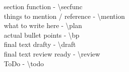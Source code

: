 \documentclass[twoside]{\myrootdir/zyx/mythesis}
\newcommand{\secfunc}[1]{{\color{magenta}#1}}
\newcommand{\mention}[1]{{\color{cyan}#1}}
\newcommand{\plan}[1]{{\color{purple}#1}}
\newcommand{\bp}[1]{{\color{violet}#1}}
\newcommand{\draft}[1]{{\color{blue}#1}}
\newcommand{\review}[1]{{\color{black}#1}}
\newcommand{\todo}[1]{{\color{orange}#1}}
\begin{document}



\secfunc{section function - \textbackslash secfunc} \\
\mention{things to mention / reference - \textbackslash mention} \\
\plan{what to write here - \textbackslash plan} \\
\bp{actual bullet points - \textbackslash bp} \\
\draft{final text drafty - \textbackslash draft} \\
\review{final text review ready - \textbackslash review} \\
\todo{ToDo - \textbackslash todo} \\



% 



\cleardoublepage
\appendix
%

\end{document}
